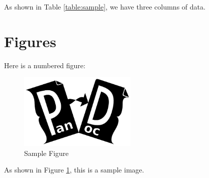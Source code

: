 \documentclass{article}
\begin{document}
As shown in Table \ref{table:sample}, we have three columns of data.

\section{Figures}
Here is a numbered figure:
\begin{figure}[h!]
\centering
\includegraphics[width=0.5\textwidth]{../images/example-image.png} %
\caption{Sample Figure}
\label{fig:sample}
\end{figure}

As shown in Figure \ref{fig:sample}, this is a sample image.
\end{document}
